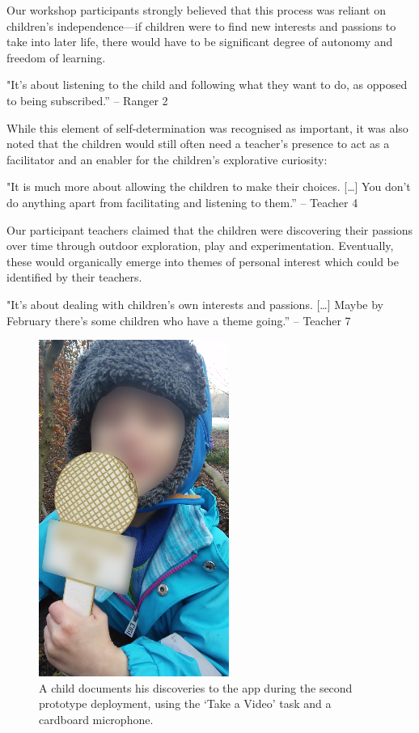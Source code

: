 Our workshop participants strongly believed that this process was reliant on children’s independence—if children were to find new interests and passions to take into later life, there would have to be significant degree of autonomy and freedom of learning. 

\begin{displayquote}
"It's about listening to the child and following what they want to do, as opposed to being subscribed.” – Ranger 2
\end{displayquote}

While this element of self-determination was recognised as important, it was also noted that the children would still often need a teacher’s presence to act as a facilitator and an enabler for the children’s explorative curiosity:

\begin{displayquote}
"It is much more about allowing the children to make their choices. […] You don’t do anything apart from facilitating and listening to them.” – Teacher 4
\end{displayquote}

Our participant teachers claimed that the children were discovering their passions over time through outdoor exploration, play and experimentation. Eventually, these would organically emerge into themes of personal interest which could be identified by their teachers.

\begin{displayquote}
"It’s about dealing with children’s own interests and passions. […] Maybe by February there’s some children who have a theme going.” – Teacher 7
\end{displayquote}

\begin{figure}
  \centering
  \includegraphics[width=0.4\columnwidth]{images/chapter04/microphone.png}
  \caption{A child documents his discoveries to the app during the second prototype deployment, using the `Take a Video' task and a cardboard microphone.}
  \label{fig:prototypeMicrophone}
\end{figure}

